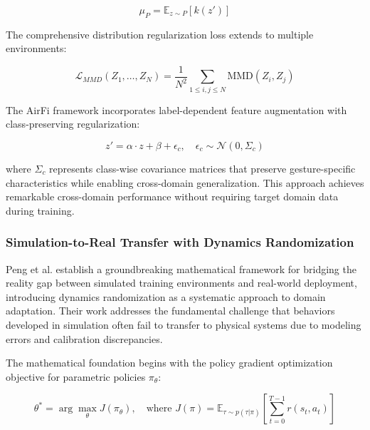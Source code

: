 \documentclass[journal]{IEEEtran}
\begin{document}
{\begin{equation}
\mu_P = \mathbb{E}_{z \sim P}[k(z')]
\label{eq:airfi_kernel_mapping}
\end{equation}

The comprehensive distribution regularization loss extends to multiple environments:

\begin{equation}
\mathcal{L}_{MMD}(Z_1, \ldots, Z_N) = \frac{1}{N^2} \sum_{1 \leq i,j \leq N} \text{MMD}(Z_i, Z_j)
\label{eq:airfi_mmd_loss}
\end{equation}

The AirFi framework incorporates label-dependent feature augmentation with class-preserving regularization:

\begin{equation}
z' = \alpha \cdot z + \beta + \epsilon_c, \quad \epsilon_c \sim \mathcal{N}(0, \Sigma_c)
\label{eq:airfi_feature_augmentation}
\end{equation}

where $\Sigma_c$ represents class-wise covariance matrices that preserve gesture-specific characteristics while enabling cross-domain generalization. This approach achieves remarkable cross-domain performance without requiring target domain data during training.

\subsubsection{Simulation-to-Real Transfer with Dynamics Randomization}

Peng et al. \cite{peng2018sim} establish a groundbreaking mathematical framework for bridging the reality gap between simulated training environments and real-world deployment, introducing dynamics randomization as a systematic approach to domain adaptation. Their work addresses the fundamental challenge that behaviors developed in simulation often fail to transfer to physical systems due to modeling errors and calibration discrepancies.

The mathematical foundation begins with the policy gradient optimization objective for parametric policies $\pi_\theta$:

\begin{equation}
\theta^* = \arg\max_\theta J(\pi_\theta), \quad \text{where } J(\pi) = \mathbb{E}_{\tau \sim p(\tau|\pi)}\left[\sum_{t=0}^{T-1} r(s_t, a_t)\right]
\label{eq:peng_policy_gradient}
\end{equation}

}
\end{document}
